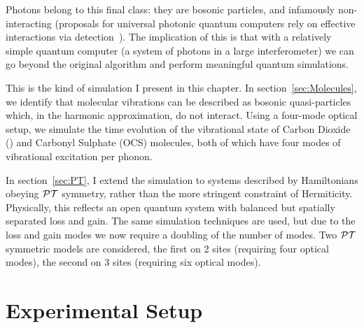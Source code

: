 Photons belong to this final class: they are bosonic particles, and infamously
non-interacting (proposals for universal photonic quantum computers rely on
effective interactions via detection~\cite{klm}). The implication of this is
that with a relatively simple quantum computer (a system of photons in a large
interferometer) we can go beyond the original \bosonsampling{} algorithm and
perform meaningful quantum simulations.

This is the kind of simulation I present in this chapter. In
section~\ref{sec:Molecules}, we identify that molecular vibrations can be
described as bosonic quasi-particles which, in the harmonic approximation, do
not interact. Using a four-mode optical setup, we simulate the time evolution
of the vibrational state of Carbon Dioxide (\co) and Carbonyl Sulphate (OCS)
molecules, both of which have four modes of vibrational excitation per phonon.

In section~\ref{sec:PT}, I extend the simulation to systems described by
Hamiltonians obeying \(\mathcal{PT}\) symmetry, rather than the more stringent
constraint of Hermiticity. Physically, this reflects an open quantum system
with balanced but spatially separated loss and gain. The same simulation
techniques are used, but due to the loss and gain modes we now require a
doubling of the number of modes. Two \(\mathcal{PT}\) symmetric models are considered,
the first on 2 sites (requiring four optical modes), the second on 3 sites
(requiring six optical modes).

\section{Experimental Setup}
